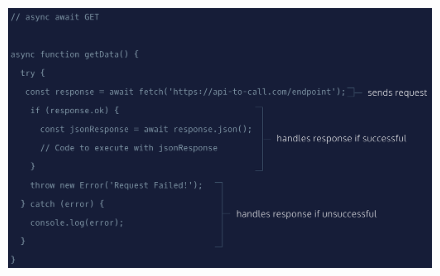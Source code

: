 \documentclass[11pt]{article}
\begin{document}
\begin{figure}[H]
\includegraphics[scale = 0.35]{18_4}
\centering
\end{figure}
\end{document}
